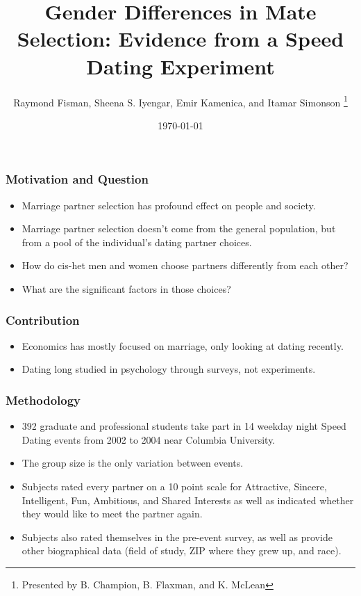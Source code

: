 \documentclass{beamer}
\title{Gender Differences in Mate Selection: Evidence from a Speed Dating Experiment}
\author{Raymond Fisman, Sheena S. Iyengar, Emir Kamenica, and Itamar Simonson \thanks{Presented by B. Champion, B. Flaxman, and K. McLean}}
\date{\today}
\begin{document}
\maketitle

\begin{frame} \frametitle{Motivation and Question}
     \begin{itemize}
        \item Marriage partner selection has profound effect on people and society. \pause
        \item Marriage partner selection doesn't come from the general population, but from a pool of the individual's dating partner choices.
        \item How do cis-het men and women choose partners differently from each other?  \pause
        \item What are the significant factors in those choices?
    \end{itemize}
\end{frame}

\begin{frame} \frametitle{Contribution}
     \begin{itemize}
        \item Economics has mostly focused on marriage, only looking at dating recently.\pause
        \item Dating long studied in psychology through surveys, not experiments.
    \end{itemize}
\end{frame}


\begin{frame} \frametitle{Methodology}
     \begin{itemize}
        \item 392 graduate and professional students take part in 14 weekday night Speed Dating events from 2002 to 2004 near Columbia University. \pause
        \item The group size is the only variation between events. \pause
        \item Subjects rated every partner on a 10 point scale for Attractive, Sincere, Intelligent, Fun, Ambitious, and Shared Interests as well as indicated whether they would like to meet the partner again. \pause
        \item Subjects also rated themselves in the pre-event survey, as well as provide other biographical data (field of study, ZIP where they grew up, and race).
    \end{itemize}
\end{frame}
\end{document}

